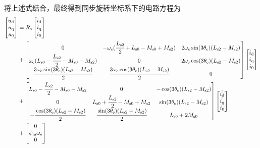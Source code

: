 将上述式结合，最终得到同步旋转坐标系下的电路方程为
\begin{align*}
    \begin{bmatrix}u_{\mathrm{d}}\\u_{\mathrm{q}}\\u_{\mathrm{0}}\end{bmatrix}&=
    R_{\mathrm{s}}\begin{bmatrix}i_{\mathrm{d}}\\i_{\mathrm{q}}\\i_{\mathrm{0}}\end{bmatrix}\\
    &+
    \begin{bmatrix}0&-\omega_{\mathrm{e}}(\cfrac{L_{\mathrm{s}2}}{2}+L_{\mathrm{s}0}-M_{\mathrm{s}0}+M_{\mathrm{s}2})
        &2\omega_{\mathrm{e}}\sin(3\theta_{\mathrm{e}})(L_{\mathrm{s}2}-M_{\mathrm{s}2})
        \\\omega_{\mathrm{e}}(L_{\mathrm{s}0}-\cfrac{L_{\mathrm{s}2}}{2}-M_{\mathrm{s}0}-M_{\mathrm{s}2})
        &0&2\omega_{\mathrm{e}}\cos(3\theta_{\mathrm{e}})(L_{\mathrm{s}2}-M_{\mathrm{s}2})\\
        \cfrac{3\omega_{\mathrm{e}}\sin(3\theta_{\mathrm{e}})(L_{\mathrm{s}2}-M_{\mathrm{s}2})}{2}
        &\cfrac{3\omega_{\mathrm{e}}\cos(3\theta_{\mathrm{e}})(L_{\mathrm{s}2}-M_{\mathrm{s}2})}{2}&0
    \end{bmatrix}
    \begin{bmatrix}i_{\mathrm{d}}\\i_{\mathrm{q}}\\i_{\mathrm{0}}\end{bmatrix}\\
    &
    +
    \begin{bmatrix}L_{\mathrm{s}0}-\cfrac{L_{\mathrm{s}2}}{2}-M_{\mathrm{s}0}-M_{\mathrm{s}2}&0
        &-\cos(3\theta_{\mathrm{e}})(L_{\mathrm{s}2}-M_{\mathrm{s}2})\\
        0&L_{\mathrm{s}0}+\cfrac{L_{\mathrm{s}2}}{2}-M_{\mathrm{s}0}+M_{\mathrm{s}2}
        &\sin(3\theta_{\mathrm{e}})(L_{\mathrm{s}2}-M_{\mathrm{s}2})\\
        -\cfrac {\cos(3\theta_{\mathrm{e}})(L_{\mathrm{s}2}-M_{\mathrm{s}2})}{2}
        &\cfrac {\sin(3\theta_{\mathrm{e}})(L_{\mathrm{s}2}-M_{\mathrm{s}2})}{2}&L_{\mathrm{s}0}+2M_{\mathrm{s}0}
    \end{bmatrix}
    \begin{bmatrix}\dot{i_{\mathrm{d}}}\\\dot{i_{\mathrm{q}}}\\\dot{i_{\mathrm{0}}}\end{bmatrix}\\
    &+\begin{bmatrix}0\\\psi_{\mathrm{m}}\omega_{\mathrm{e}}\\0\end{bmatrix}
\end{align*}

